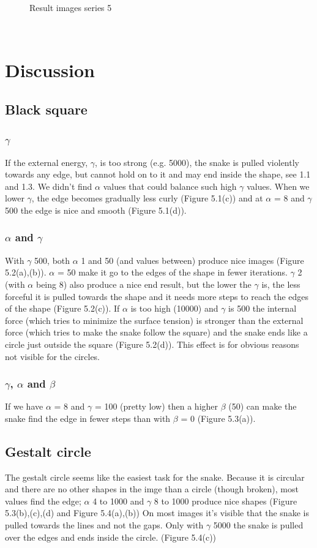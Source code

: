 \documentclass[paper=a4, fontsize=11pt]{scrartcl} %
\numberwithin{equation}{section} %
\numberwithin{figure}{section} %
\numberwithin{table}{section} %
\begin{document}
\begin{figure}[H]
        \caption{Result images series 5 }\label{fig:animals}
\end{figure}

\

\section{Discussion}
\subsection{Black square}
\subsubsection{$\gamma$}
If the external energy, $\gamma$, is too strong (e.g. 5000), the snake is pulled violently towards any edge, but cannot hold on to it and may end inside the shape, see 1.1 and 1.3. We didn't find $\alpha$ values that could balance such high $\gamma$ values. When we lower $\gamma$, the edge becomes gradually less curly (Figure 5.1(c)) and at $\alpha$ = 8 and $\gamma$ 500 the edge is nice and smooth (Figure 5.1(d)).
\
\subsubsection{$\alpha$ and $\gamma$}
With $\gamma$ 500, both $\alpha$ 1 and 50 (and values between) produce nice images (Figure 5.2(a),(b)). $\alpha$ = 50 make it go to the edges of the shape in fewer iterations. $\gamma$ 2 (with $\alpha$ being 8) also produce a nice end result, but the lower the $\gamma$ is, the less forceful it is pulled towards the shape and it needs more steps to reach the edges of the shape (Figure 5.2(c)). If $\alpha$ is too high (10000) and $\gamma$ is 500 the internal force (which tries to minimize the surface tension) is stronger than the external force (which tries to make the snake follow the square) and the snake ends like a circle just outside the square (Figure 5.2(d)). This effect is for obvious reasons not visible for the circles.\\
\subsubsection{$\gamma$, $\alpha$ and $\beta$}
If we have $\alpha$ = 8 and $\gamma$ = 100 (pretty low) then a higher $\beta$ (50) can make the snake find the edge in fewer steps than with $\beta$ = 0 (Figure 5.3(a)). 
\
\subsection{Gestalt circle}
The gestalt circle seems like the easiest task for the snake. Because it is circular and there are no other shapes in the imge than a circle (though broken), most values find the edge; $\alpha$ 4 to 1000 and $\gamma$ 8 to 1000 produce nice shapes (Figure 5.3(b),(c),(d) and Figure 5.4(a),(b))  On most images it's visible that the snake is pulled towards the lines and not the gaps. Only with $\gamma$ 5000 the snake is pulled over the edges and ends inside the circle. (Figure 5.4(c)) 
\
\end{document}
